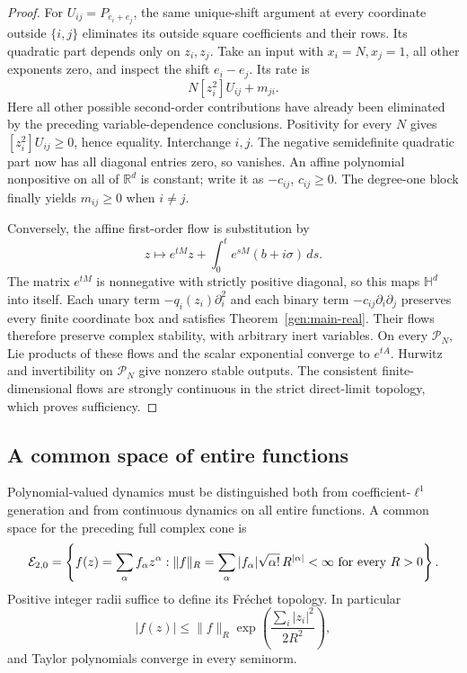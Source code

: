 \documentclass[reqno]{amsart}
\theoremstyle{definition}
\theoremstyle{remark}
\newcommand{\R}{\mathbb R}
\newcommand{\HH}{\mathbb H}
\begin{document}
\begin{proof}
For \(U_{ij}=P_{e_i+e_j}\), the same unique-shift argument at every
coordinate outside \(\{i,j\}\) eliminates its outside square coefficients
and their rows.  Its quadratic part depends only on \(z_i,z_j\).
Take an input with \(x_i=N,x_j=1\), all other exponents zero, and inspect
the shift \(e_i-e_j\).  Its rate is
\[
 N[z_i^2]U_{ij}+m_{ji}.
\]
Here all other possible second-order contributions have already been
eliminated by the preceding variable-dependence conclusions.
Positivity for every \(N\) gives \([z_i^2]U_{ij}\ge0\), hence equality.
Interchange \(i,j\).  The negative semidefinite quadratic part now has
all diagonal entries zero, so vanishes.  An affine polynomial nonpositive
on all of \(\R^d\) is constant; write it as \(-c_{ij}\), \(c_{ij}\ge0\).
The degree-one block finally yields \(m_{ij}\ge0\) when \(i\ne j\).

Conversely, the affine first-order flow is substitution by
\[
 z\longmapsto e^{tM}z+\int_0^t e^{sM}(b+i\sigma)\,ds.
\]
The matrix \(e^{tM}\) is nonnegative with strictly positive diagonal, so
this maps \(\HH^d\) into itself.  Each unary term
\(-q_i(z_i)\partial_i^2\) and each binary term
\(-c_{ij}\partial_i\partial_j\) preserves every finite coordinate box and
satisfies Theorem~\ref{gen:main-real}.  Their flows therefore preserve
complex stability, with arbitrary inert variables.  On every
\(\mathcal P_N\), Lie products of these flows and the scalar exponential
converge to \(e^{tA}\).  Hurwitz and invertibility on \(\mathcal P_N\)
give nonzero stable outputs.  The consistent finite-dimensional flows
are strongly continuous in the strict direct-limit topology, which
proves sufficiency.
\end{proof}

\subsection{A common space of entire functions}

Polynomial-valued dynamics must be distinguished both from
coefficient-\(\ell^1\) generation and from continuous dynamics on all entire
functions.  A common space for the preceding full complex cone is
\[
 \mathcal E_{2,0}
 =\left\{f(z)=\sum_\alpha f_\alpha z^\alpha:
   \|f\|_R=\sum_\alpha |f_\alpha|\sqrt{\alpha!}\,R^{|\alpha|}
                    <\infty\ \hbox{for every }R>0\right\}.
\]
Positive integer radii suffice to define its Fr\'echet topology.
In particular
\[
 |f(z)|\le\|f\|_R
       \exp\left(\frac{\sum_i|z_i|^2}{2R^2}\right),
\]
and Taylor polynomials converge in every seminorm.
\end{document}
